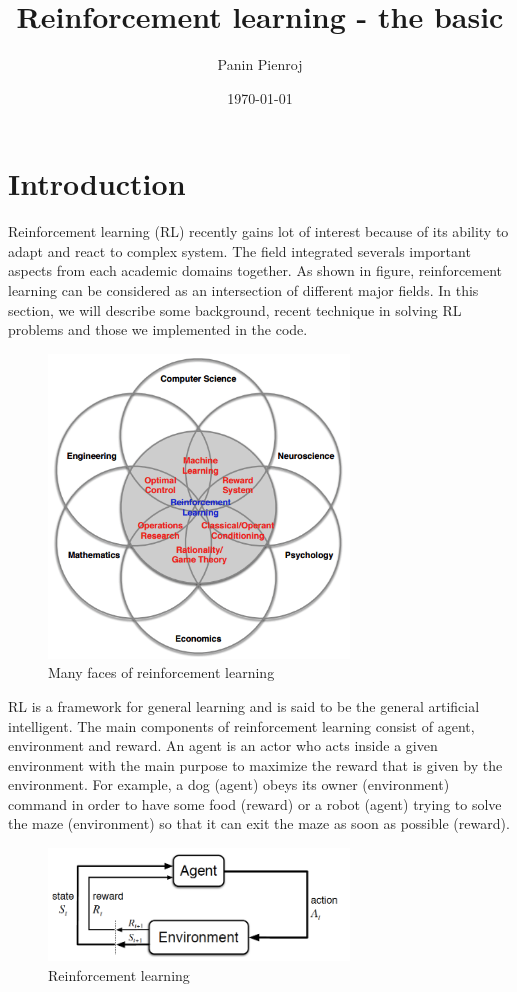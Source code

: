 \documentclass{article}
\title{Reinforcement learning - the basic}
\author{Panin Pienroj}
\date{\today}
\begin{document}
 
\maketitle
 
\section{Introduction}


Reinforcement learning (RL) recently gains lot of interest because of its ability to adapt and react to complex system. The field integrated severals important aspects from 
each academic domains together. As shown in figure, reinforcement learning can be 
considered as an intersection of different major fields. In this section, we will 
describe some background, recent technique in solving RL problems and those we 
implemented in the code. 

\begin{figure}[h]
\includegraphics[width=8cm]{./pic/introduction/diagram.png}
\centering
\caption{Many faces of reinforcement learning}
\end{figure}

RL is a framework for general learning and is said to be the general artificial intelligent. The main components of reinforcement learning consist of agent, environment and reward. An agent is an actor who acts inside a given environment with the main purpose to maximize the reward that is given by the environment. For example, a dog (agent) obeys its owner (environment) command in order to have some food (reward) or a robot (agent) trying to solve the maze (environment) so that it can exit the maze as soon as possible (reward).

\begin{figure}[h]
\includegraphics[width=8cm]{./pic/introduction/Sutton}
\centering
\caption{Reinforcement learning}
\end{figure}
\end{document}
